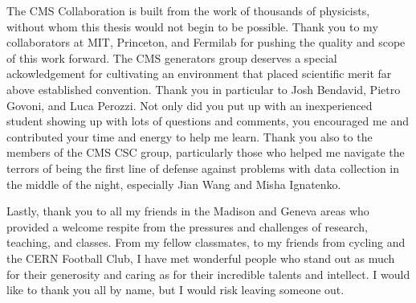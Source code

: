 The CMS Collaboration is built from the work of thousands of physicists,
without whom this thesis would not begin to be possible. Thank you to
my collaborators at MIT, Princeton, and Fermilab for pushing the quality
and scope of this work forward.
The CMS generators group deserves a special ackowledgement
for cultivating an environment that placed scientific merit far above
established convention. Thank you in particular to Josh
Bendavid, Pietro Govoni, and Luca Perozzi. Not only did you put up with an
inexperienced student showing up with lots of questions and comments,
you encouraged me and contributed your time and energy to help me learn.
Thank you also to the members of the CMS CSC group, particularly those
who helped me navigate the terrors of being the first line of defense
against problems with data collection in the middle of the night,
especially Jian Wang and Misha Ignatenko.

Lastly, thank you to all my friends in the Madison and Geneva areas
who provided a welcome respite from the pressures and challenges of
research, teaching, and classes. From my fellow classmates, to my friends from cycling and
the CERN Football Club, I have met wonderful people who stand out
as much for their generosity and caring as for their incredible talents
and intellect. I would like to thank you all by name, but I would
risk leaving someone out.


